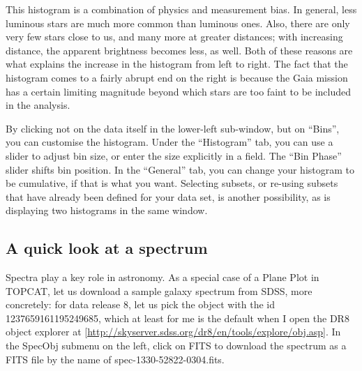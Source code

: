 \documentclass[twocolumn,apj]{openjournal}
\begin{document}
This histogram is a combination of physics and measurement bias. In general, less luminous stars are much more common than luminous ones. Also, there are only very few stars close to us, and many more at greater distances; with increasing distance, the apparent brightness becomes less, as well. Both of these reasons are what explains the increase in the histogram from left to right. The fact that the histogram comes to a fairly abrupt end on the right is because the Gaia mission has a certain limiting magnitude beyond which stars are too faint to be included in the analysis. 

By clicking not on the data itself in the lower-left sub-window, but on ``Bins'', you can customise the histogram. Under the ``Histogram'' tab, you can use a slider to adjust bin size, or enter the size explicitly in a field. The ``Bin Phase'' slider shifts bin position. In the ``General'' tab, you can change your histogram to be cumulative, if that is what you want. Selecting subsets, or re-using subsets that have already been defined for your data set, is another possibility, as is displaying two histograms in the same window.

\subsection{A quick look at a spectrum}

Spectra play a key role in astronomy. As a special case of a Plane Plot in TOPCAT, let us download a sample galaxy spectrum from SDSS, more concretely: for data release 8, let us pick the object with the id 1237659161195249685, which at least for me is the default when I open the DR8 object explorer at [\href{http://skyserver.sdss.org/dr8/en/tools/explore/obj.asp}{http://skyserver.sdss.org/dr8/en/tools/explore/obj.asp}]. In the SpecObj submenu on the left, click on FITS to download the spectrum as a FITS file by the name of spec-1330-52822-0304.fits.
\end{document}
